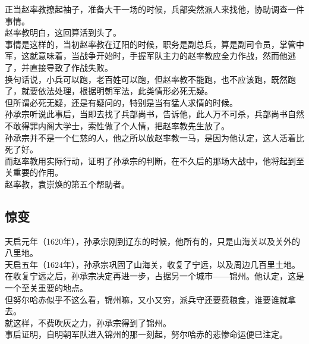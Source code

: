 \begin{multicols}{\theparacolNo}
正当赵率教撩起袖子，准备大干一场的时候，兵部突然派人来找他，协助调查一件事情。\\

赵率教明白，这回算活到头了。\\

事情是这样的，当初赵率教在辽阳的时候，职务是副总兵，算是副司令员，掌管中军，这就意味着，当战争开始时，手握军队主力的赵率教应全力作战，然而他逃了，并直接导致了作战失败。\\

换句话说，小兵可以跑，老百姓可以跑，但赵率教不能跑，也不应该跑，既然跑了，就要依法处理，根据明朝军法，此类情形必死无疑。\\

但所谓必死无疑，还是有疑问的，特别是当有猛人求情的时候。\\

孙承宗听说此事后，当即去找了兵部尚书，告诉他，此人万不可杀，兵部尚书自然不敢得罪内阁大学士，索性做了个人情，把赵率教先生放了。\\

孙承宗并不是一个仁慈的人，他之所以放赵率教一马，是因为他认定，这人活着比死了好。\\

而赵率教用实际行动，证明了孙承宗的判断，在不久后的那场大战中，他将起到至关重要的作用。\\

赵率教，袁崇焕的第五个帮助者。\\

\subsection{惊变}
天启元年（1620年），孙承宗刚到辽东的时候，他所有的，只是山海关以及关外的八里地。\\

天启五年（1624年），孙承宗巩固了山海关，收复了宁远，以及周边几百里土地。\\

在收复宁远之后，孙承宗决定再进一步，占据另一个城市——锦州。他认定，这是一个至关重要的地点。\\

但努尔哈赤似乎不这么看，锦州嘛，又小又穷，派兵守还要费粮食，谁要谁就拿去。\\

就这样，不费吹灰之力，孙承宗得到了锦州。\\

事后证明，自明朝军队进入锦州的那一刻起，努尔哈赤的悲惨命运便已注定。\\


\end{multicols}
